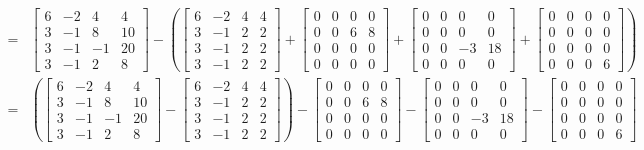 \begin{tcolorbox}
\begin{align*}
    =& \left[\begin{array}{rrrr} 6 & -2 & 4 & 4\\ 3 & -1 & 8 & 10 \\ 3 & -1 & -1 & 20 \\ 3 & -1 & 2 & 8 \end{array}\right]  
    - \left( \left[\begin{array}{rrrr} 6 & -2 & 4 & 4\\ 3 & -1 & 2 & 2 \\ 3 & -1 & 2 & 2 \\ 3 & -1 & 2 & 2 \end{array}\right] + \left[\begin{array}{rrrr} 0 & 0 & 0 & 0\\ 0 & 0 & 6 & 8 \\ 0 & 0 & 0 & 0 \\ 0 &0 & 0 &0 \end{array}\right]  + \left[\begin{array}{rrrr} 0 & 0 & 0 & 0\\ 0 & 0 & 0 & 0 \\ 0 & 0 & -3 & 18 \\ 0 & 0 & 0 & 0 \end{array}\right] + \left[\begin{array}{rrrr} 0 & 0 & 0 & 0\\ 0 & 0 & 0 & 0 \\ 0 & 0 & 0 & 0 \\ 0 & 0 & 0 & 6 \end{array}\right] \right) \\ 
    =& \left( \left[\begin{array}{rrrr} 6 & -2 & 4 & 4\\ 3 & -1 & 8 & 10 \\ 3 & -1 & -1 & 20 \\ 3 & -1 & 2 & 8 \end{array}\right]  
    - \left[\begin{array}{rrrr} 6 & -2 & 4 & 4\\ 3 & -1 & 2 & 2 \\ 3 & -1 & 2 & 2 \\ 3 & -1 & 2 & 2 \end{array}\right] \right) - \left[\begin{array}{rrrr} 0 & 0 & 0 & 0\\ 0 & 0 & 6 & 8 \\ 0 & 0 & 0 & 0 \\ 0 &0 & 0 &0 \end{array}\right]  - \left[\begin{array}{rrrr} 0 & 0 & 0 & 0\\ 0 & 0 & 0 & 0 \\ 0 & 0 & -3 & 18 \\ 0 & 0 & 0 & 0 \end{array}\right] - \left[\begin{array}{rrrr} 0 & 0 & 0 & 0\\ 0 & 0 & 0 & 0 \\ 0 & 0 & 0 & 0 \\ 0 & 0 & 0 & 6 \end{array}\right]  \\ 

\end{align*}
\end{tcolorbox}

